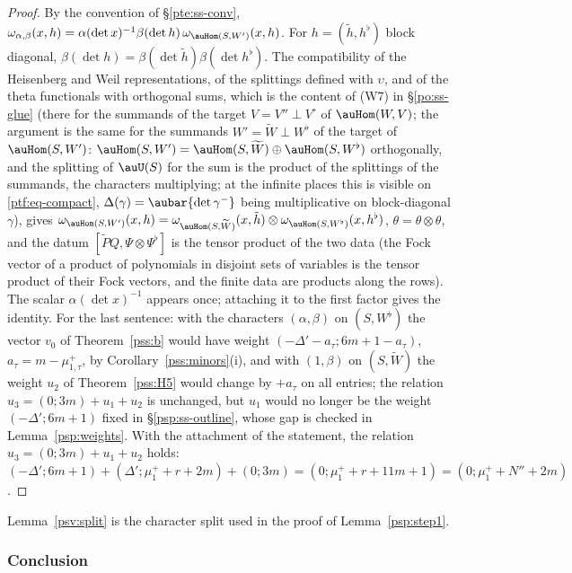 \documentclass[10pt]{amsart}
\theoremstyle{definition}
\theoremstyle{remark}
\begin{document}
\begin{proof}
By the convention of \S\ref{pte:ss-conv}, $\omega_{\alpha,\beta}(x,h)=\alpha(\det x)^{-1}\beta(\det h)\,\omega_{\auHom(S,W')}(x,h)$. For
$h=(\tilde h,h^\flat)$ block diagonal, $\beta(\det h)=\beta(\det\tilde h)\beta(\det h^\flat)$. The compatibility of the
Heisenberg and Weil representations, of the splittings defined with $\upsilon$, and of the theta functionals with orthogonal
sums, which is the content of (W7) in \S\ref{po:ss-glue} (there for the summands of the target $V=V''\perp V^\circ$ of
$\auHom(W,V)$; the argument is the same for the summands $W'=\widetilde W\perp W^\flat$ of the target of $\auHom(S,W')$:
$\auHom(S,W')=\auHom(S,\widetilde W)\oplus\auHom(S,W^\flat)$ orthogonally, and the splitting of $\auU(S)$ for the sum is the
product of the splittings of the summands, the characters multiplying; at the infinite places this is visible on
\eqref{ptf:eq-compact}, $\Delta(\gamma)=\aubar{\det\gamma^-}$ being multiplicative on block-diagonal $\gamma$), gives
$\omega_{\auHom(S,W')}(x,h)=\omega_{\auHom(S,\widetilde W)}(x,\tilde h)\otimes\omega_{\auHom(S,W^\flat)}(x,h^\flat)$,
$\theta=\theta\otimes\theta$, and the datum $[\widetilde PQ,\Psi\otimes\Psi^\flat]$ is the tensor product of the two data (the
Fock vector of a product of polynomials in disjoint sets of variables is the tensor product of their Fock vectors, and the
finite data are products along the rows). The scalar $\alpha(\det x)^{-1}$ appears once; attaching it to the first
factor gives the identity. For the last sentence: with the characters $(\alpha,\beta)$ on $(S,W^\flat)$ the vector
$v_0$ of Theorem~\ref{pss:b} would have weight $(-\Delta'-a_\tau;6m+1-a_\tau)$, $a_\tau=m-\mu^+_{1,\tau}$, by
Corollary~\ref{pss:minors}(i), and with $(1,\beta)$ on $(S,\widetilde W)$ the weight $u_2$ of Theorem~\ref{pss:H5} would
change by $+a_\tau$ on all entries; the relation $u_3=(0;3m)+u_1+u_2$ is unchanged, but $u_1$ would no longer be
the weight $(-\Delta';6m+1)$ fixed in \S\ref{psp:ss-outline}, whose gap is checked in Lemma~\ref{psp:weights}. With the
attachment of the statement, the relation $u_3=(0;3m)+u_1+u_2$ holds: $(-\Delta';6m+1)+(\Delta';\mu^+_1+r+2m)+(0;3m)=
(0;\mu^+_1+r+11m+1)=(0;\mu^+_1+N''+2m)$.
\end{proof}

\noindent Lemma~\ref{psv:split} is the character split used in the proof of Lemma~\ref{psp:step1}.

\subsubsection{Conclusion}\label{psv:ss-main}
\end{document}
